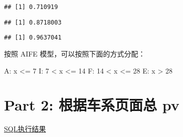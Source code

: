 \documentclass[]{article}
\newenvironment{Shaded}{\begin{snugshade}}{\end{snugshade}}
\newcommand{\KeywordTok}[1]{\textcolor[rgb]{0.13,0.29,0.53}{\textbf{#1}}}
\newcommand{\DataTypeTok}[1]{\textcolor[rgb]{0.13,0.29,0.53}{#1}}
\newcommand{\DecValTok}[1]{\textcolor[rgb]{0.00,0.00,0.81}{#1}}
\newcommand{\CharTok}[1]{\textcolor[rgb]{0.31,0.60,0.02}{#1}}
\newcommand{\StringTok}[1]{\textcolor[rgb]{0.31,0.60,0.02}{#1}}
\newcommand{\OtherTok}[1]{\textcolor[rgb]{0.56,0.35,0.01}{#1}}
\newcommand{\OperatorTok}[1]{\textcolor[rgb]{0.81,0.36,0.00}{\textbf{#1}}}
\newcommand{\NormalTok}[1]{#1}
\begin{document}
\begin{verbatim}
## [1] 0.710919
\end{verbatim}

\begin{Shaded}
\end{Shaded}

\begin{verbatim}
## [1] 0.8718003
\end{verbatim}

\begin{Shaded}
\end{Shaded}

\begin{verbatim}
## [1] 0.9637041
\end{verbatim}

按照 AIFE 模型，可以按照下面的方式分配：

A: x \textless{}= 7 I: 7 \textless{} x \textless{}= 14 F: 14 \textless{}
x \textless{}= 28 E: x \textgreater{} 28

\section{Part 2: 根据车系页面总 pv}\label{part-2--pv}

\href{https://data.bytedance.net/aeolus/\#/queryEditor/query/45f906f434cdb80e?group=default\&blockId=1828089\&taskId=6500277}{SQL执行结果}

\begin{Shaded}
\end{Shaded}
\end{document}
